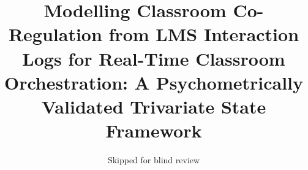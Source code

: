 \documentclass[preprint,12pt,authoryear]{elsarticle}
\begin{document}
\linenumbers

\begin{frontmatter}

\title{Modelling Classroom Co-Regulation from LMS Interaction Logs for Real-Time Classroom Orchestration: A Psychometrically Validated Trivariate State Framework}

\author{Skipped for blind review}







\end{frontmatter}
\end{document}
